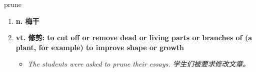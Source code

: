 
\begin{frame}
{\huge prune}
\begin{center}
\begin{enumerate}\Large
  \item \textbf{n. 梅干}
  \item \textbf{vt. 修剪: to cut off or remove dead or living parts or branches of (a plant, for example) to improve shape or growth}
  \begin{itemize}
    \item \em{\Large{The students were asked to prune their essays. 学生们被要求修改文章。}}
  \end{itemize}
\end{enumerate}
\end{center}
\end{frame}
